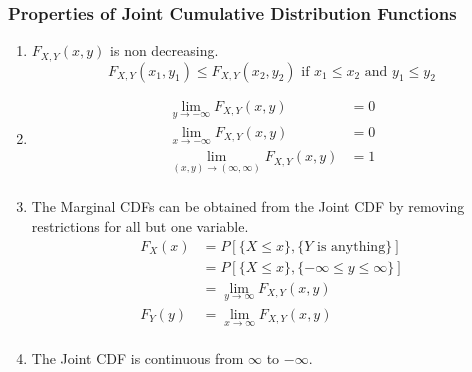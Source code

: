		\subsubsection{Properties of Joint Cumulative Distribution Functions} \label{subsubsec:Properties of Joint Cumulative Distribution Functions}
			\begin{enumerate}[label=\textbf{(\roman*)}, noitemsep, nolistsep]
				\item $F_{X,Y} \left( x,y \right)$ is non decreasing.
					\begin{equation} \label{eq:Joint CDF Property 1}
						F_{X,Y} \left( x_{1},y_{1} \right) \leq F_{X,Y} \left( x_{2},y_{2} \right) \text{ if } x_{1} \leq x_{2} \text{ and } y_{1} \leq y_{2}
					\end{equation}
				\item \begin{equation} \label{eq:Joint CDF Property 2}
						\begin{aligned}
							\lim\limits_{y \rightarrow -\infty} F_{X,Y} \left( x,y \right) &= 0 \\
							\lim\limits_{x \rightarrow -\infty} F_{X,Y} \left( x,y \right) &= 0 \\
							\lim\limits_{\left( x,y \right) \rightarrow \left( \infty, \infty \right)} F_{X,Y} \left( x,y \right) &= 1 \\
						\end{aligned}
					\end{equation}
				\item The Marginal CDFs can be obtained from the Joint CDF by removing restrictions for all but one variable.
					\begin{equation} \label{eq:Joint CDF Property 3}
						\begin{aligned}
							F_{X} \left( x \right) &= P \left[ \lbrace X \leq x \rbrace, \lbrace Y \text{ is anything} \rbrace \right] \\
													   &= P \left[ \lbrace X \leq x \rbrace, \lbrace -\infty \leq y \leq \infty \rbrace \right] \\
													   &= \lim\limits_{y \rightarrow \infty} F_{X,Y} \left( x,y \right) \\
							F_{Y} \left( y \right) &= \lim\limits_{x \rightarrow \infty} F_{X,Y} \left( x,y \right) \\
						\end{aligned}
					\end{equation}
				\item The Joint CDF is continuous from $\infty$ to $-\infty$.

\end{enumerate}
